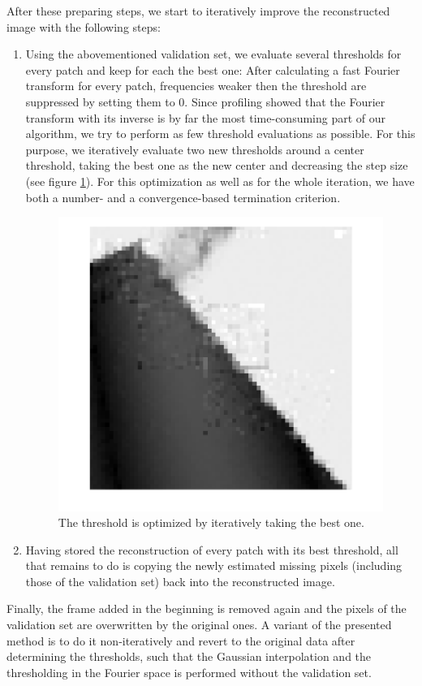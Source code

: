 \documentclass[10pt,conference,compsocconf]{IEEEtran}
\begin{document}
After these preparing steps, we start to iteratively improve the reconstructed image with the following steps:
\begin{enumerate}
\item Using the abovementioned validation set, we evaluate several thresholds for every patch and keep for each the best one: After calculating a fast Fourier transform for every patch, frequencies weaker then the threshold are suppressed by setting them to 0. Since profiling showed that the Fourier transform with its inverse is by far the most time-consuming part of our algorithm, we try to perform as few threshold evaluations as possible. For this purpose, we iteratively evaluate two new thresholds around a center threshold, taking the best one as the new center and decreasing the step size (see figure \ref{threshold_optimization}). For this optimization as well as for the whole iteration, we have both a number- and a convergence-based termination criterion.

\begin{figure}
\centering
\includegraphics[width=\columnwidth]{images/framing_artifacts.png}
\caption{The threshold is optimized by iteratively taking the best one.}
\label{threshold_optimization}
\end{figure}

\item Having stored the reconstruction of every patch with its best threshold, all that remains to do is copying the newly estimated missing pixels (including those of the validation set) back into the reconstructed image.
\end{enumerate}
Finally, the frame added in the beginning is removed again and the pixels of the validation set are overwritten by the original ones. A variant of the presented method is to do it non-iteratively and revert to the original data after determining the thresholds, such that the Gaussian interpolation and the thresholding in the Fourier space is performed without the validation set.
\end{document}
